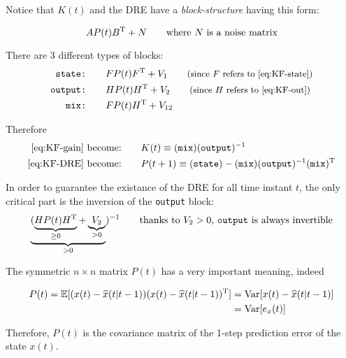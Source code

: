 \begin{remark}
    Notice that $K(t)$ and the DRE have  a \emph{block-structure} having this form: 
    
    \[ AP(t)B^{\mathrm{T}}+N  \qquad \text{where $N$ is a noise matrix}\]

    There are 3 different types of blocks:
    \begin{align*}
        \texttt{state:} \qquad& FP(t)F^{\mathrm{T}}+V_1 \qquad\text{\small{(since $F$ refers to \ref{eq:KF-state})}}\\
        \texttt{output:} \qquad& HP(t)H^{\mathrm{T}}+V_2 \qquad\text{\small{(since $H$ refers to \ref{eq:KF-out})}}\\
        \texttt{mix:} \qquad& FP(t)H^{\mathrm{T}}+V_{12}
    \end{align*}

    Therefore
    \begin{align*}
        \text{\ref{eq:KF-gain} become:} \qquad& K(t) \equiv (\texttt{mix})(\texttt{output})^{-1} \\
        \text{\ref{eq:KF-DRE} become:} \qquad& P(t+1) \equiv (\texttt{state}) - (\texttt{mix})(\texttt{output})^{-1}(\texttt{mix})^{\mathrm{T}}
    \end{align*}
\end{remark}


\begin{remark}
    In order to guarantee the existance of the DRE for all time instant $t$, the only critical part is the inversion of the \texttt{output} block:
    \[
        \underbrace{(\underbrace{HP(t)H^{\mathrm{T}}}_{\ge 0} + \underbrace{V_2}_{>0}}_{>0})^{-1} \qquad \text{thanks to $V_2>0$,  \texttt{output} is always invertible}
    \]
\end{remark}

\begin{remark}[Meaning of $P(t)$]
    The symmetric $n \times n$ matrix $P(t)$ has a very important meaning, indeed

    \begin{align*}
        P(t) = \mathbb{E}[(x(t) - \widehat{x}(t|t-1))(x(t) - \widehat{x}(t|t-1))^{\mathrm{T}}] 
        &= \text{Var}[x(t) - \widehat{x}(t|t-1)] \\
        &= \text{Var}[e_x(t)]     
    \end{align*}

    Therefore, $P(t)$ is the covariance matrix of the 1-step prediction error of the state $x(t)$.
\end{remark}


